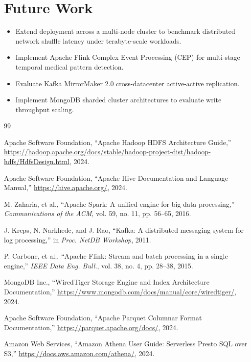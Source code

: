 \documentclass[12pt,a4paper]{report}
\begin{document}
\section{Future Work}
\begin{itemize}
    \item Extend deployment across a multi-node cluster to benchmark distributed network shuffle latency under terabyte-scale workloads.
    \item Implement Apache Flink Complex Event Processing (CEP) for multi-stage temporal medical pattern detection.
    \item Evaluate Kafka MirrorMaker 2.0 cross-datacenter active-active replication.
    \item Implement MongoDB sharded cluster architectures to evaluate write throughput scaling.
\end{itemize}

\clearpage

\begin{thebibliography}{99}

Apache Software Foundation, ``Apache Hadoop HDFS Architecture Guide,'' \url{https://hadoop.apache.org/docs/stable/hadoop-project-dist/hadoop-hdfs/HdfsDesign.html}, 2024.

Apache Software Foundation, ``Apache Hive Documentation and Language Manual,'' \url{https://hive.apache.org/}, 2024.

M. Zaharia, et al., ``Apache Spark: A unified engine for big data processing,'' \textit{Communications of the ACM}, vol. 59, no. 11, pp. 56--65, 2016.

J. Kreps, N. Narkhede, and J. Rao, ``Kafka: A distributed messaging system for log processing,'' in \textit{Proc. NetDB Workshop}, 2011.

P. Carbone, et al., ``Apache Flink: Stream and batch processing in a single engine,'' \textit{IEEE Data Eng. Bull.}, vol. 38, no. 4, pp. 28--38, 2015.

MongoDB Inc., ``WiredTiger Storage Engine and Index Architecture Documentation,'' \url{https://www.mongodb.com/docs/manual/core/wiredtiger/}, 2024.

Apache Software Foundation, ``Apache Parquet Columnar Format Documentation,'' \url{https://parquet.apache.org/docs/}, 2024.

Amazon Web Services, ``Amazon Athena User Guide: Serverless Presto SQL over S3,'' \url{https://docs.aws.amazon.com/athena/}, 2024.

\end{thebibliography}
\end{document}

